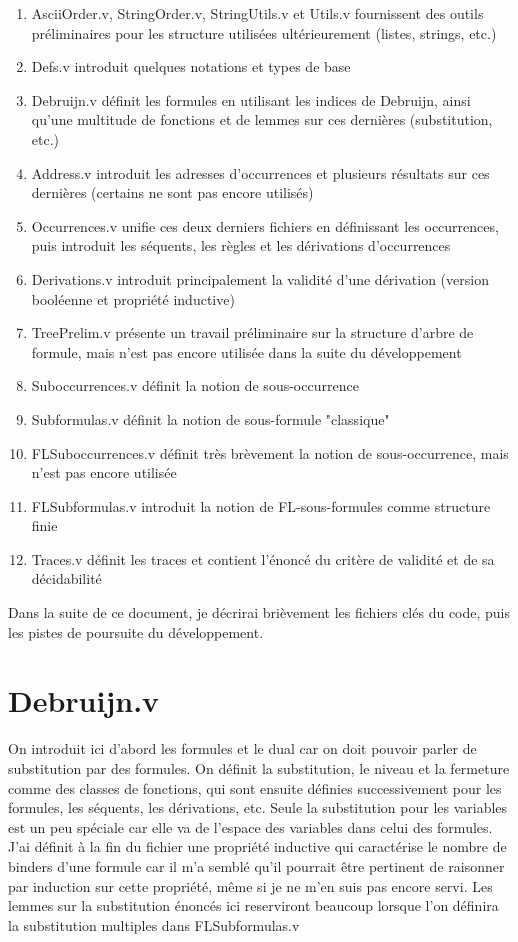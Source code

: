 \documentclass[12pt]{article}
\theoremstyle{break}
\begin{document}
\begin{enumerate}
\item AsciiOrder.v, StringOrder.v, StringUtils.v et Utils.v fournissent des outils préliminaires pour les structure utilisées ultérieurement (listes, strings, etc.)
\item Defs.v introduit quelques notations et types de base
\item Debruijn.v définit les formules en utilisant les indices de Debruijn, ainsi qu'une multitude de fonctions et de lemmes sur ces dernières (substitution, etc.)
\item Address.v introduit les adresses d'occurrences et plusieurs résultats sur ces dernières (certains ne sont pas encore utilisés)
\item Occurrences.v unifie ces deux derniers fichiers en définissant les occurrences, puis introduit les séquents, les règles et les dérivations d'occurrences
\item Derivations.v introduit principalement la validité d'une dérivation (version booléenne et propriété inductive)
\item TreePrelim.v présente un travail préliminaire sur la structure d'arbre de formule, mais n'est pas encore utilisée dans la suite du développement
\item Suboccurrences.v définit la notion de sous-occurrence
\item Subformulas.v définit la notion de sous-formule "classique"
\item FLSuboccurrences.v définit très brèvement la notion de sous-occurrence, mais n'est pas encore utilisée
\item FLSubformulas.v introduit la notion de FL-sous-formules comme structure finie
\item Traces.v définit les traces et contient l'énoncé du critère de validité et de sa décidabilité 
\end{enumerate}

Dans la suite de ce document, je décrirai brièvement les fichiers clés du code, puis les pistes de poursuite du développement. 

\section{Debruijn.v}
On introduit ici d'abord les formules et le dual car on doit pouvoir parler de substitution par des formules. 
On définit la substitution, le niveau et la fermeture comme des classes de fonctions, qui sont ensuite définies successivement 
pour les formules, les séquents, les dérivations, etc.
Seule la substitution pour les variables est un peu spéciale car elle va de l'espace des variables dans celui des formules.
J'ai définit à la fin du fichier une propriété inductive qui caractérise le nombre de binders d'une formule car il m'a semblé qu'il pourrait être pertinent de 
raisonner par induction sur cette propriété, même si je ne m'en suis pas encore servi.
Les lemmes sur la substitution énoncés ici reserviront beaucoup lorsque l'on définira la substitution multiples dans FLSubformulas.v
\end{document}
